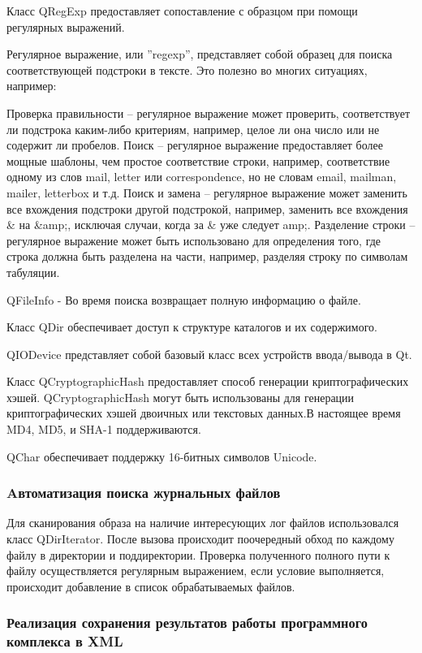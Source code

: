 Класс QRegExp предоставляет сопоставление с образцом при помощи регулярных выражений.

Регулярное выражение, или ''regexp'', представляет собой образец для поиска соответствующей подстроки в тексте. Это полезно во многих ситуациях, например:

Проверка правильности -- регулярное выражение может проверить, соответствует ли подстрока каким-либо критериям, например, целое ли она число или не содержит ли пробелов.
Поиск -- регулярное выражение предоставляет более мощные шаблоны, чем простое соответствие строки, например, соответствие одному из слов mail, letter или correspondence, но не словам email, mailman, mailer, letterbox и т.д.
Поиск и замена -- регулярное выражение может заменить все вхождения подстроки другой подстрокой, например, заменить все вхождения \& на \&amp;, исключая случаи, когда за \& уже следует amp;.
Разделение строки -- регулярное выражение может быть использовано для определения того, где строка должна быть разделена на части, например, разделяя строку по символам табуляции.

QFileInfo  - Во время поиска возвращает полную информацию о файле.

Класс QDir обеспечивает доступ к структуре каталогов и их содержимого.

QIODevice представляет собой базовый класс всех устройств ввода/вывода в Qt.

Класс QCryptographicHash предоставляет способ генерации криптографических хэшей.
QCryptographicHash могут быть использованы для генерации криптографических хэшей двоичных или текстовых данных.В настоящее время MD4, MD5, и SHA-1 поддерживаются. \cite{qtcross}

QChar обеспечивает поддержку 16-битных символов Unicode.

\subsubsection{Aвтоматизация поиска журнальных файлов}

Для сканирования образа на наличие интересующих лог файлов использовался класс QDirIterator. После вызова происходит поочередный обход по каждому файлу в директории и поддиректории. Проверка полученного полного пути к файлу осуществляется регулярным выражением, если условие выполняется, происходит добавление в список обрабатываемых файлов.

\subsubsection{Реализация сохранения результатов работы программного комплекса в XML}

